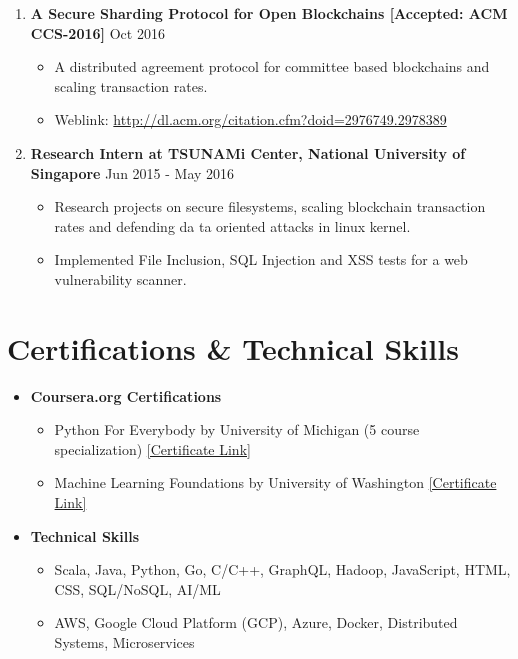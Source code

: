 \documentclass{article}
\newcommand{\bi}{\vspace{-1mm}\begin{itemize}[align=left,leftmargin=*, rightmargin=80pt, labelindent=0pt,labelsep=2pt, label={-}, nosep]}
\newcommand{\ei}{\end{itemize}}
\begin{document}
\begin{enumerate}
    \item \textbf{A Secure Sharding Protocol for Open Blockchains [Accepted: ACM CCS-2016]} {\hfill Oct 2016}
    \bi

        \item A distributed agreement protocol for committee based blockchains and scaling transaction rates.

        \item Weblink: \href{http://dl.acm.org/citation.cfm?doid=2976749.2978389}{http://dl.acm.org/citation.cfm?doid=2976749.2978389}
    \ei

    \item \textbf{Research Intern at TSUNAMi Center, National University of Singapore} {\hfill Jun 2015 - May 2016}
    \bi
        \item Research projects on secure filesystems, scaling blockchain transaction rates and defending da
ta oriented attacks in linux kernel.

        \item Implemented File Inclusion, SQL Injection and XSS tests for a web vulnerability scanner.
    \ei

\end{enumerate}

\vspace{-2mm}
\section*{Certifications \& Technical Skills}
\begin{itemize}
    \item \textbf{Coursera.org Certifications}
    \bi
        \item Python For Everybody by University of Michigan (5 course specialization) \href{https://www.coursera.org/account/accomplishments/specialization/2B5PCJGZ9WEE}{[Certificate Link]}

        \item Machine Learning Foundations by University of Washington \href{https://www.coursera.org/account/accomplishments/certificate/NDVXWMCYKX9N}{[Certificate Link]}
    \ei

    \item \textbf{Technical Skills}
    \bi
        \item Scala, Java, Python, Go, C/C++, GraphQL, Hadoop, JavaScript, HTML, CSS, SQL/NoSQL, AI/ML
        \item AWS, Google Cloud Platform (GCP), Azure, Docker, Distributed Systems, Microservices
    \ei
\end{itemize}
\end{document}
